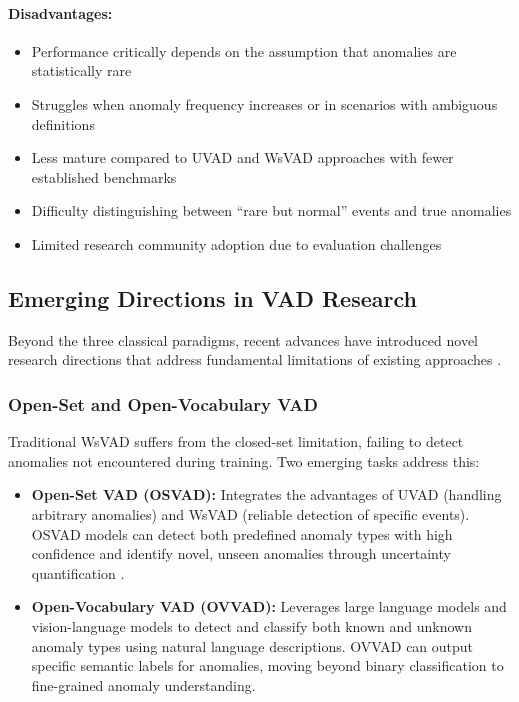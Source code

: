 \documentclass[12pt]{article}
\begin{document}
\paragraph{Disadvantages:}
\begin{itemize}
    \item Performance critically depends on the assumption that anomalies are statistically rare
    \item Struggles when anomaly frequency increases or in scenarios with ambiguous definitions
    \item Less mature compared to UVAD and WsVAD approaches with fewer established benchmarks
    \item Difficulty distinguishing between ``rare but normal'' events and true anomalies
    \item Limited research community adoption due to evaluation challenges
\end{itemize}

\clearpage
\subsection{Emerging Directions in VAD Research}
Beyond the three classical paradigms, recent advances have introduced novel research directions that address fundamental limitations of existing approaches \citep{liu2024networking}.

\subsubsection{Open-Set and Open-Vocabulary VAD}
Traditional WsVAD suffers from the closed-set limitation, failing to detect anomalies not encountered during training. Two emerging tasks address this:

\begin{itemize}
    \item \textbf{Open-Set VAD (OSVAD):} Integrates the advantages of UVAD (handling arbitrary anomalies) and WsVAD (reliable detection of specific events). OSVAD models can detect both predefined anomaly types with high confidence and identify novel, unseen anomalies through uncertainty quantification \citep{liu2024networking}.
    
    \item \textbf{Open-Vocabulary VAD (OVVAD):} Leverages large language models and vision-language models to detect and classify both known and unknown anomaly types using natural language descriptions. OVVAD can output specific semantic labels for anomalies, moving beyond binary classification to fine-grained anomaly understanding.
\end{itemize}
\end{document}
